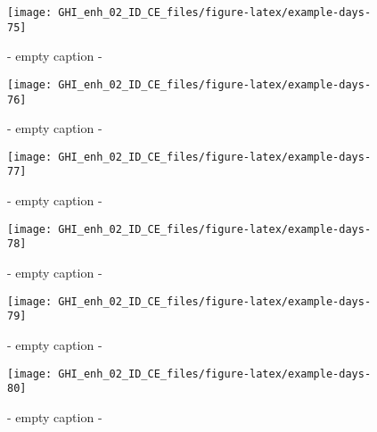 \documentclass[
  10pt,
  a4paper,oneside]{article}
\begin{document}
\begin{figure}[H]

{\centering \texttt{[image: GHI\_enh\_02\_ID\_CE\_files/figure-latex/example-days-75]} 

}

\caption{ - empty caption - }\label{fig:example-days-75}
\end{figure}

\begin{figure}[H]

{\centering \texttt{[image: GHI\_enh\_02\_ID\_CE\_files/figure-latex/example-days-76]} 

}

\caption{ - empty caption - }\label{fig:example-days-76}
\end{figure}

\begin{figure}[H]

{\centering \texttt{[image: GHI\_enh\_02\_ID\_CE\_files/figure-latex/example-days-77]} 

}

\caption{ - empty caption - }\label{fig:example-days-77}
\end{figure}

\begin{figure}[H]

{\centering \texttt{[image: GHI\_enh\_02\_ID\_CE\_files/figure-latex/example-days-78]} 

}

\caption{ - empty caption - }\label{fig:example-days-78}
\end{figure}

\begin{figure}[H]

{\centering \texttt{[image: GHI\_enh\_02\_ID\_CE\_files/figure-latex/example-days-79]} 

}

\caption{ - empty caption - }\label{fig:example-days-79}
\end{figure}

\begin{figure}[H]

{\centering \texttt{[image: GHI\_enh\_02\_ID\_CE\_files/figure-latex/example-days-80]} 

}

\caption{ - empty caption - }\label{fig:example-days-80}
\end{figure}
\end{document}
